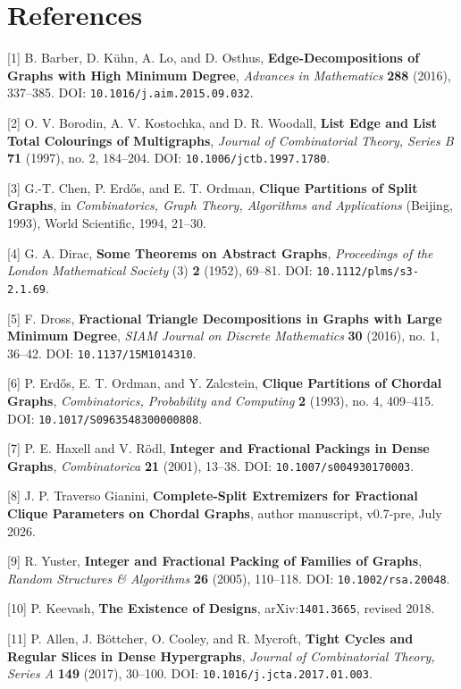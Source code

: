 \documentclass[11pt,a4paper]{article}
\begin{document}
\section{References}\label{references}

{[}1{]} B. Barber, D. Kühn, A. Lo, and D. Osthus, \textbf{Edge-Decompositions of Graphs with High Minimum Degree}, \emph{Advances in Mathematics} \textbf{288} (2016), 337--385. DOI: \texttt{10.1016/j.aim.2015.09.032}.

{[}2{]} O. V. Borodin, A. V. Kostochka, and D. R. Woodall, \textbf{List Edge and List Total Colourings of Multigraphs}, \emph{Journal of Combinatorial Theory, Series B} \textbf{71} (1997), no. 2, 184--204. DOI: \texttt{10.1006/jctb.1997.1780}.

{[}3{]} G.-T. Chen, P. Erdős, and E. T. Ordman, \textbf{Clique Partitions of Split Graphs}, in \emph{Combinatorics, Graph Theory, Algorithms and Applications} (Beijing, 1993), World Scientific, 1994, 21--30.

{[}4{]} G. A. Dirac, \textbf{Some Theorems on Abstract Graphs}, \emph{Proceedings of the London Mathematical Society} (3) \textbf{2} (1952), 69--81. DOI: \texttt{10.1112/plms/s3-2.1.69}.

{[}5{]} F. Dross, \textbf{Fractional Triangle Decompositions in Graphs with Large Minimum Degree}, \emph{SIAM Journal on Discrete Mathematics} \textbf{30} (2016), no. 1, 36--42. DOI: \texttt{10.1137/15M1014310}.

{[}6{]} P. Erdős, E. T. Ordman, and Y. Zalcstein, \textbf{Clique Partitions of Chordal Graphs}, \emph{Combinatorics, Probability and Computing} \textbf{2} (1993), no. 4, 409--415. DOI: \texttt{10.1017/S0963548300000808}.

{[}7{]} P. E. Haxell and V. Rödl, \textbf{Integer and Fractional Packings in Dense Graphs}, \emph{Combinatorica} \textbf{21} (2001), 13--38. DOI: \texttt{10.1007/s004930170003}.

{[}8{]} J. P. Traverso Gianini, \textbf{Complete-Split Extremizers for Fractional Clique Parameters on Chordal Graphs}, author manuscript, v0.7-pre, July 2026.

{[}9{]} R. Yuster, \textbf{Integer and Fractional Packing of Families of Graphs}, \emph{Random Structures \& Algorithms} \textbf{26} (2005), 110--118. DOI: \texttt{10.1002/rsa.20048}.

{[}10{]} P. Keevash, \textbf{The Existence of Designs}, arXiv:\texttt{1401.3665}, revised 2018.

{[}11{]} P. Allen, J. Böttcher, O. Cooley, and R. Mycroft, \textbf{Tight Cycles and Regular Slices in Dense Hypergraphs}, \emph{Journal of Combinatorial Theory, Series A} \textbf{149} (2017), 30--100. DOI: \texttt{10.1016/j.jcta.2017.01.003}.
\end{document}
